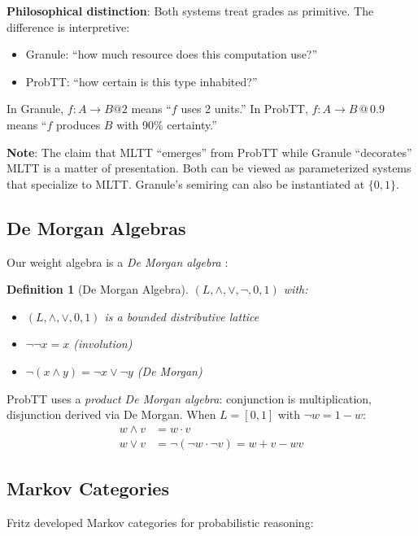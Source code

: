 \documentclass[11pt,a4paper]{article}
\makeatletter
\newtheorem{definition}{Definition}[section]
\newcommand{\at}[1]{\,@\,#1}
\newcommand{\negw}{\neg}
\makeatother
\begin{document}
\textbf{Philosophical distinction}: Both systems treat grades as primitive. The difference is interpretive:
\begin{itemize}
    \item Granule: ``how much resource does this computation use?''
    \item ProbTT: ``how certain is this type inhabited?''
\end{itemize}

In Granule, $f : A \to B @ 2$ means ``$f$ uses 2 units.'' In ProbTT, $f : A \to B \at{0.9}$ means ``$f$ produces $B$ with 90\% certainty.''

\textbf{Note}: The claim that MLTT ``emerges'' from ProbTT while Granule ``decorates'' MLTT is a matter of presentation. Both can be viewed as parameterized systems that specialize to MLTT. Granule's semiring can also be instantiated at $\{0,1\}$.

\subsection{De Morgan Algebras}

Our weight algebra is a \emph{De Morgan algebra} \citep{kalman1958lattices}:

\begin{definition}[De Morgan Algebra]
$(L, \land, \lor, \neg, 0, 1)$ with:
\begin{itemize}
    \item $(L, \land, \lor, 0, 1)$ is a bounded distributive lattice
    \item $\neg\neg x = x$ (involution)
    \item $\neg(x \land y) = \neg x \lor \neg y$ (De Morgan)
\end{itemize}
\end{definition}

ProbTT uses a \emph{product De Morgan algebra}: conjunction is multiplication, disjunction derived via De Morgan. When $L = [0,1]$ with $\neg w = 1-w$:
\begin{align}
w \land v &= w \cdot v \\
w \lor v &= \negw(\negw w \cdot \negw v) = w + v - wv
\end{align}

\subsection{Markov Categories}

Fritz \citep{fritz2020synthetic} developed Markov categories for probabilistic reasoning:
\end{document}

